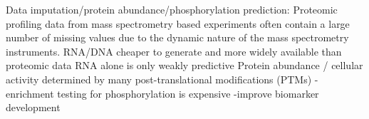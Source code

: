 \documentclass{report}
\begin{document}
	Data imputation/protein abundance/phosphorylation prediction: 
	Proteomic profiling data from mass spectrometry based experiments often contain a large number of missing values due to the dynamic nature of the mass spectrometry instruments.
	RNA/DNA cheaper to generate and more widely available than proteomic data
	RNA alone is only weakly predictive \cite{vogel2012insights}
	Protein abundance / cellular activity determined by many post-translational modifications (PTMs)
	-enrichment testing for phosphorylation is expensive
	-improve biomarker development
	
	
	
	
	
	
	
\end{document}
